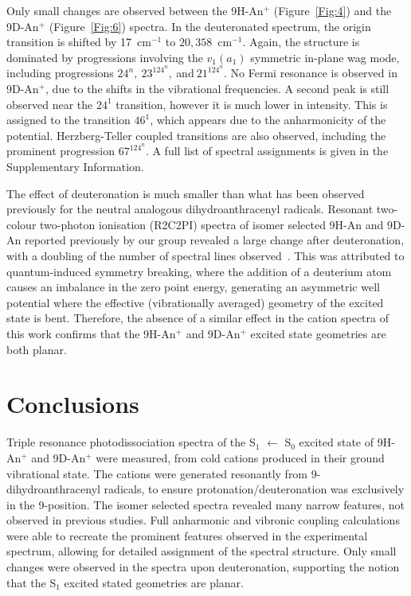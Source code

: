 \documentclass[journal=jpcafh,manuscript=article,layout=onecolumn, 12pt]{achemso}
\begin{document}
Only small changes are observed between the 9H-An$^+$ (Figure~\ref{Fig:4}) and the 9D-An$^+$ (Figure~\ref{Fig:6}) spectra. In the deuteronated spectrum, the origin transition is shifted by 17~cm$^{-1}$ to $20,358$~cm$^{-1}$. Again, the structure is dominated by progressions involving the $v_1 (a_1)$ symmetric in-plane wag mode, including progressions $24^n,~23^124^n,~$and$~21^124^n$. No Fermi resonance is observed in 9D-An$^+$, due to the shifts in the vibrational frequencies. A second peak is still observed near the $24^1$ transition, however it is much lower in intensity. This is assigned to the transition $46^1$, which appears due to the anharmonicity of the potential. Herzberg-Teller coupled transitions are also observed, including the prominent progression $67^124^n$. A full list of spectral assignments is given in the Supplementary Information.

The effect of deuteronation is much smaller than what has been observed previously for the neutral analogous dihydroanthracenyl radicals. Resonant two-colour two-photon ionisation (R2C2PI) spectra of isomer selected 9H-An and 9D-An reported previously by our group revealed a large change after deuteronation, with a doubling of the number of spectral lines observed~\cite{kre19}. This was attributed to quantum-induced symmetry breaking, where the addition of a deuterium atom causes an imbalance in the zero point energy, generating an asymmetric well potential where the effective (vibrationally averaged) geometry of the excited state is bent. Therefore, the absence of a similar effect in the cation spectra of this work confirms that the 9H-An$^+$ and 9D-An$^+$ excited state geometries are both planar.

\section{Conclusions}
Triple resonance photodissociation spectra of the S$_1$ $\leftarrow$ S$_0$ excited state of 9H-An$^+$ and 9D-An$^+$ were measured, from cold cations produced in their ground vibrational state. The cations were generated resonantly from  9-dihydroanthracenyl radicals, to ensure protonation/deuteronation was exclusively in the 9-position. The isomer selected spectra revealed many narrow features, not observed in previous studies. Full anharmonic and vibronic coupling calculations were able to recreate the prominent features observed in the experimental spectrum, allowing for detailed assignment of the spectral structure. Only small changes were observed in the spectra upon deuteronation, supporting the notion that the S$_1$ excited stated geometries are planar.
\end{document}

